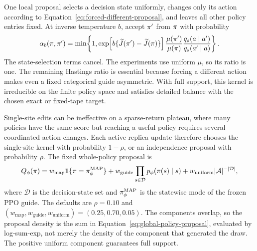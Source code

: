 
One local proposal selects a decision state uniformly, changes only its action
according to Equation~\eqref{eq:forced-different-proposal}, and leaves all
other policy entries fixed.  At inverse temperature \(b\), accept
\(\pi'\) from \(\pi\) with probability
\begin{equation}
  \alpha_b(\pi,\pi')
  = \min\!\left\{1,
      \exp\!\left[b\{\widetilde J(\pi')-
                       \widetilde J(\pi)\}\right]
      \frac{\mu(\pi')}{\mu(\pi)}
      \frac{q_s(a\mid a')}{q_s(a'\mid a)}
    \right\}.
  \label{eq:local-mh}
\end{equation}
The state-selection terms cancel.  The experiments use uniform \(\mu\), so
its ratio is one.  The remaining Hastings ratio is essential because forcing a
different action makes even a fixed categorical guide asymmetric.  With full
support, this kernel is irreducible on the finite policy space and satisfies
detailed balance with the chosen exact or fixed-tape target.


Single-site edits can be ineffective on a sparse-return plateau, where many
policies have the same score but reaching a useful policy requires several
coordinated action changes.  Each active replica update therefore chooses the
single-site kernel with probability \(1-\rho\), or an independence proposal
with probability \(\rho\).  The fixed whole-policy proposal is
\begin{equation}
  Q_\phi(\pi)
  =w_{\mathrm{map}}\mathbf 1\{\pi=\pi_\phi^{\mathrm{MAP}}\}
   +w_{\mathrm{guide}}\prod_{s\in\mathcal D}
       p_\phi(\pi(s)\mid s)
   +w_{\mathrm{uniform}}|\mathcal A|^{-|\mathcal D|},
  \label{eq:global-policy-proposal}
\end{equation}
where \(\mathcal D\) is the decision-state set and
\(\pi_\phi^{\mathrm{MAP}}\) is the statewise mode of the frozen PPO guide.
The defaults are
\(\rho=0.10\) and
\((w_{\mathrm{map}},w_{\mathrm{guide}},w_{\mathrm{uniform}})
=(0.25,0.70,0.05)\).  The components overlap, so the proposal density is the
sum in Equation~\eqref{eq:global-policy-proposal}, evaluated by log-sum-exp,
not merely the density of the component that generated the draw.  The positive
uniform component guarantees full support.

